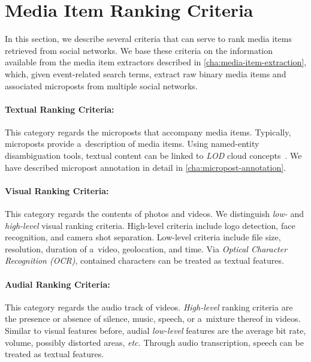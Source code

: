 \section{Media Item Ranking Criteria}

In this section, we describe several criteria that can serve to rank
media items retrieved from social networks. 
We base these criteria on the information available from
the media item extractors described in \autoref{cha:media-item-extraction},
which, given event-related search terms,
extract raw binary media items and associated microposts
from multiple social networks.

\paragraph{Textual Ranking Criteria:}

This category regards the microposts that accompany media items.
Typically, microposts provide a~description of media items.
Using named-entity disambiguation tools,
textual content can be linked to \emph{LOD} cloud concepts~\cite{steiner2011addingmeaning}.
We have described micropost annotation in detail in \autoref{cha:micropost-annotation}.

\paragraph{Visual Ranking Criteria:} \label{sec:visualrankingcriteria}

This category regards the contents of photos and videos.
We distinguish \emph{low-} and \emph{high-level} visual ranking criteria.
High-level criteria include logo detection,
face recognition, and camera shot separation.
Low-level criteria include file size, resolution,
duration of a~video, geolocation, and time.
Via \emph{Optical Character Recognition (OCR)}, contained characters can be treated as textual features.

\paragraph{Audial Ranking Criteria:}

This category regards the audio track of videos.
\emph{High-level} ranking criteria are the presence or absence
of silence, music, speech, or a~mixture thereof in videos.
Similar to visual features before,
audial \emph{low-level} features are the average bit rate,
volume, possibly distorted areas, \emph{etc.}
Through audio transcription, speech can be treated as textual features.

